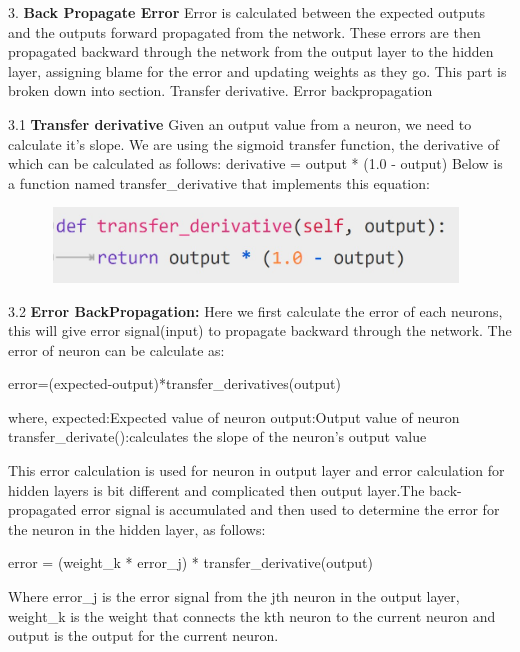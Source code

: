 {3. \textbf{Back Propagate Error}\newline
Error is calculated between the expected outputs and the outputs forward propagated from the network. These errors are then propagated backward through the network from the output layer to the hidden layer, assigning blame for the error and updating weights as they go.\newline
 This part is broken down into section. Transfer derivative. Error backpropagation
 
 3.1 \textbf{Transfer derivative}\newline
 Given an output value from a neuron, we need to calculate it’s slope. We are using the sigmoid transfer function, the derivative of which can be calculated as follows:\newline
        derivative = output * (1.0 - output)\newline
 Below is a function named transfer\_derivative that implements this equation:
 \begin{figure}[H]
\begin{center}
\includegraphics[width=110mm,height=20mm]{backexplain/transferDerivative.jpg}
\end{center}
\end{figure} 

3.2 \textbf{Error BackPropagation:}\newline
Here we first calculate the error of each neurons, this will give error signal(input) to propagate backward through the network.\newline
The error of neuron can be calculate as:\newline
 \centerline{error=(expected-output)*transfer\_derivatives(output)}
where,\newline
expected:Expected value of neuron \newline 
output:Output value of neuron\newline
transfer\_derivate():calculates the slope of the neuron’s output value

This error calculation is used for neuron in output layer and error calculation for hidden layers is bit different and complicated then output layer.\newline The back-propagated error signal is accumulated and then used to determine the error for the neuron in the hidden layer, as follows:\newline
           \centerline{error = (weight\_k * error\_j) * transfer\_derivative(output)}
Where error\_j is the error signal from the jth neuron in the output layer, weight\_k is the weight that connects the kth neuron to the current neuron and output is the output for the current neuron.

}
